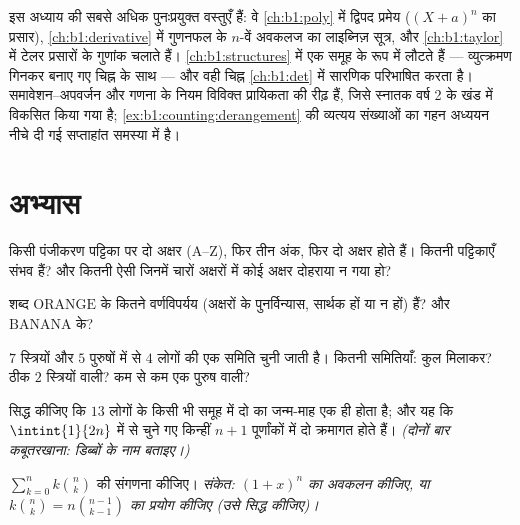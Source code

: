 \begin{remark}[यह अध्याय कहाँ काम आता है]\label{rem:b1:counting:whereused}
 इस अध्याय की सबसे अधिक पुनःप्रयुक्त वस्तुएँ हैं: वे
\cref{ch:b1:poly} में द्विपद प्रमेय ($(X + a)^n$ का प्रसार),
\cref{ch:b1:derivative} में गुणनफल के $n$-वें अवकलज का लाइब्निज़ सूत्र, और
\cref{ch:b1:taylor} में टेलर प्रसारों के गुणांक चलाते हैं। 
\cref{ch:b1:structures} में एक समूह के रूप में लौटते हैं --- व्युत्क्रमण
गिनकर बनाए गए चिह्न के साथ --- और वही चिह्न \cref{ch:b1:det} में सारणिक
परिभाषित करता है। समावेशन--अपवर्जन और गणना के नियम विविक्त प्रायिकता की
 रीढ़ हैं, जिसे स्नातक वर्ष 2 के खंड में विकसित किया गया है;
\cref{ex:b1:counting:derangement} की व्यत्यय संख्याओं का गहन अध्ययन नीचे दी
गई सप्ताहांत समस्या में है।
\end{remark}

\section{अभ्यास}

\begin{exercise}[$\star$]\label{exo:b1:counting:1}
किसी पंजीकरण पट्टिका पर दो अक्षर (A--Z), फिर तीन अंक, फिर दो अक्षर होते हैं।
कितनी पट्टिकाएँ संभव हैं? और कितनी ऐसी जिनमें चारों अक्षरों में कोई अक्षर
दोहराया न गया हो?
\end{exercise}

\begin{exercise}[$\star$]\label{exo:b1:counting:2}
शब्द $\mathrm{ORANGE}$ के कितने वर्णविपर्यय (अक्षरों के पुनर्विन्यास, सार्थक
हों या न हों) हैं? और $\mathrm{BANANA}$ के?
\end{exercise}

\begin{exercise}[$\star$]\label{exo:b1:counting:3}
$7$ स्त्रियों और $5$ पुरुषों में से $4$ लोगों की एक समिति चुनी जाती है।
कितनी समितियाँ: कुल मिलाकर? ठीक $2$ स्त्रियों वाली? कम से कम एक पुरुष वाली?
\end{exercise}

\begin{exercise}[$\star$]\label{exo:b1:counting:4}
सिद्ध कीजिए कि $13$ लोगों के किसी भी समूह में दो का जन्म-माह एक ही होता है;
और यह कि $\intint{1}{2n}$ में से चुने गए किन्हीं $n + 1$ पूर्णांकों में दो
क्रमागत होते हैं। \emph{(दोनों बार कबूतरखाना: डिब्बों के नाम बताइए।)}
\end{exercise}

\begin{exercise}[$\star$]\label{exo:b1:counting:5}
$\sum_{k=0}^{n} k \binom{n}{k}$ की संगणना कीजिए। \emph{संकेत: $(1 + x)^n$ का
अवकलन कीजिए, या $k \binom nk = n \binom{n-1}{k-1}$ का प्रयोग कीजिए (उसे
सिद्ध कीजिए)।}
\end{exercise}

